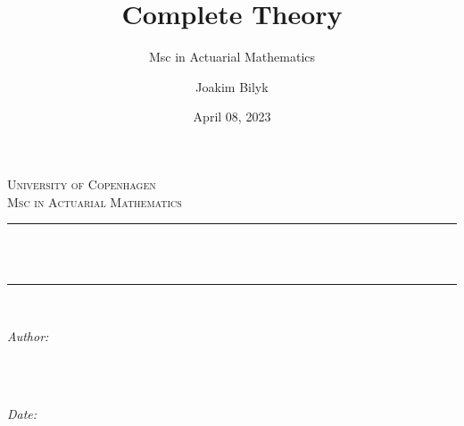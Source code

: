 \documentclass[
]{book}
\title{Complete Theory}
\subtitle{Msc in Actuarial Mathematics}
\author{Joakim Bilyk}
\date{April 08, 2023}
\begin{document}
\allowdisplaybreaks
\setlength{\abovedisplayskip}{10pt}
\setlength{\belowdisplayskip}{10pt}
\setlength{\abovedisplayshortskip}{-10pt}
\setlength{\belowdisplayshortskip}{0pt}



{
\begin{titlepage}
\newcommand{\HRule}{\rule{\linewidth}{0.5mm}} %

\center %
 

\textsc{\LARGE University of Copenhagen}\\[4cm] %
\textsc{\Large Msc in Actuarial Mathematics}\\[0.5cm] %


\HRule \\[0.4cm]
{ \huge \bfseries \thetitle}\\[0.4cm] %
\HRule \\[1.5cm]
 

\begin{minipage}{0.4\textwidth}
\begin{flushleft} \large
\emph{Author:}\\
\textsc{\theauthor} \\
\end{flushleft}
\end{minipage}
~
\begin{minipage}{0.4\textwidth}
\begin{flushright} \large
\emph{Date:} \\
\textsc{\thedate} \\
\end{flushright}
\end{minipage}\\[2cm]


\end{titlepage}}
\end{document}
